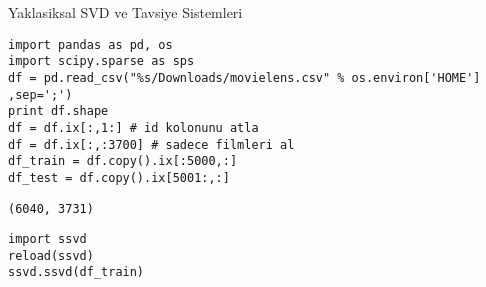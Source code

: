 \documentclass[12pt,fleqn]{article}\usepackage{../common}
\begin{document}
Yaklasiksal SVD ve Tavsiye Sistemleri

\begin{verbatim}
import pandas as pd, os
import scipy.sparse as sps
df = pd.read_csv("%s/Downloads/movielens.csv" % os.environ['HOME'] ,sep=';')
print df.shape
df = df.ix[:,1:] # id kolonunu atla
df = df.ix[:,:3700] # sadece filmleri al
df_train = df.copy().ix[:5000,:]
df_test = df.copy().ix[5001:,:]
\end{verbatim}

\begin{verbatim}
(6040, 3731)
\end{verbatim}












\begin{verbatim}
import ssvd
reload(ssvd)
ssvd.ssvd(df_train)
\end{verbatim}
\end{document}
